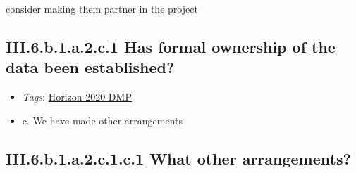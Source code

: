 \documentclass[a4paper,12pt]{report}
\begin{document}
\noindent
\begin{markdown}
consider making them partner in the project
\end{markdown}


\subsection*{\protect\textcolor{colorSecId}{III.6.b.1.a.2.c.1} Has formal ownership of the data been established?}

\label{b1df3c74-0b1f-4574-81c4-4cc2d780c1af.f87c331d-794a-42c8-a910-61a2a9110dab.e4ca2d31-137a-46d3-96cd-3e9e8c5e9a76.f5fef09d-ade5-4019-b089-f05bd89c34bc.0c3ac72c-1f6a-4c3c-b8d2-6bf287367436.ee59664e-4026-4796-a42a-e8003df6dadf.f2784b7e-b0ed-4973-9d68-954c5c24e8bb.aa27852a-00f4-44a4-a85c-0e0fd3ac20d1}


\begin{itemize}
  \item \textit{Tags}: \ul{Horizon 2020 DMP}
  \end{itemize}




\begin{itemize}
  \item[\CheckmarkBold] c. We have made other arrangements
\end{itemize}




\subsection*{\protect\textcolor{colorSecId}{III.6.b.1.a.2.c.1.c.1} What other arrangements?}

\label{b1df3c74-0b1f-4574-81c4-4cc2d780c1af.f87c331d-794a-42c8-a910-61a2a9110dab.e4ca2d31-137a-46d3-96cd-3e9e8c5e9a76.f5fef09d-ade5-4019-b089-f05bd89c34bc.0c3ac72c-1f6a-4c3c-b8d2-6bf287367436.ee59664e-4026-4796-a42a-e8003df6dadf.f2784b7e-b0ed-4973-9d68-954c5c24e8bb.aa27852a-00f4-44a4-a85c-0e0fd3ac20d1.399245d4-7988-461c-b940-ee813a1c99b1.227f056a-ada1-473b-af71-bb63d48b4940}
\end{document}
